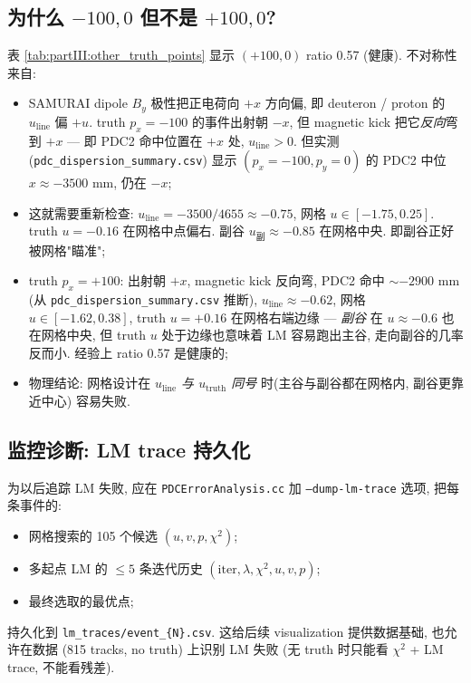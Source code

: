 \subsection{为什么 $-100, 0$ 但不是 $+100, 0$?}
\label{sec:partIII:basin:asymmetry}

表 \ref{tab:partIII:other_truth_points} 显示 $(+100, 0)$ ratio 0.57 (健康). 不对称性来自:

\begin{itemize}[nosep]
  \item SAMURAI dipole $B_y$ 极性把正电荷向 $+x$ 方向偏, 即 deuteron / proton 的 $u_{\mathrm{line}}$ 偏 $+u$. truth $p_x = -100$ 的事件出射朝 $-x$, 但 magnetic kick 把它\emph{反向}弯到 $+x$ — 即 PDC2 命中位置在 $+x$ 处, $u_{\mathrm{line}} > 0$. 但实测 (\texttt{pdc\_dispersion\_summary.csv}) 显示 $(p_x = -100, p_y = 0)$ 的 PDC2 中位 $x \approx -3500$ mm, 仍在 $-x$;
  \item 这就需要重新检查: $u_{\mathrm{line}} = -3500/4655 \approx -0.75$, 网格 $u \in [-1.75, 0.25]$. truth $u = -0.16$ 在网格中点偏右. 副谷 $u_{\mathrm{副}} \approx -0.85$ 在网格中央. 即副谷正好被网格"瞄准";
  \item truth $p_x = +100$: 出射朝 $+x$, magnetic kick 反向弯, PDC2 命中 $\sim -2900$ mm (从 \texttt{pdc\_dispersion\_summary.csv} 推断), $u_{\mathrm{line}} \approx -0.62$, 网格 $u \in [-1.62, 0.38]$, truth $u = +0.16$ 在网格右端边缘 — \emph{副谷} 在 $u \approx -0.6$ 也在网格中央, 但 truth $u$ 处于边缘也意味着 LM 容易跑出主谷, 走向副谷的几率反而小. 经验上 ratio 0.57 是健康的;
  \item 物理结论: 网格设计在 \emph{$u_{\mathrm{line}}$ 与 $u_{\mathrm{truth}}$ 同号} 时(主谷与副谷都在网格内, 副谷更靠近中心) 容易失败.
\end{itemize}

\subsection{监控诊断: LM trace 持久化}
\label{sec:partIII:basin:lm_trace}

为以后追踪 LM 失败, 应在 \texttt{PDCErrorAnalysis.cc} 加 \texttt{--dump-lm-trace} 选项, 把每条事件的:
\begin{itemize}[nosep]
  \item 网格搜索的 105 个候选 $(u, v, p, \chi^2)$;
  \item 多起点 LM 的 $\le 5$ 条迭代历史 $(\mathrm{iter}, \lambda, \chi^2, u, v, p)$;
  \item 最终选取的最优点;
\end{itemize}
持久化到 \texttt{lm\_traces/event\_\{N\}.csv}. 这给后续 visualization 提供数据基础, 也允许在数据 (815 tracks, no truth) 上识别 LM 失败 (无 truth 时只能看 $\chi^2$ + LM trace, 不能看残差).

